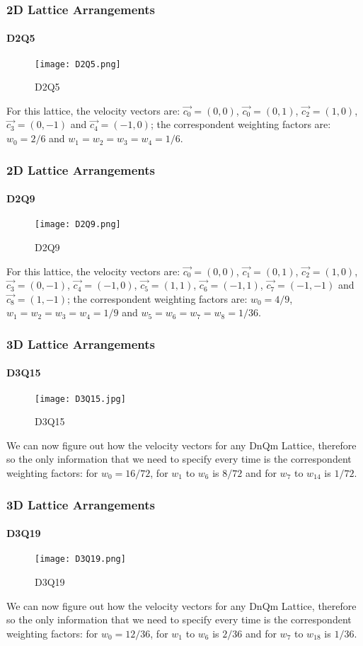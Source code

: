 \documentclass[12pt]{beamer}
\begin{document}
\begin{frame}
  \frametitle{2D Lattice Arrangements}
  \framesubtitle{D2Q5}
  \begin{figure}
    \centering
    \texttt{[image: D2Q5.png]}
    \caption{D2Q5}
  \end{figure}
  For this lattice, the velocity vectors are: $\vec{c_0}=(0,0)$, 
  $\vec{c_0}=(0,1)$, $\vec{c_2}=(1,0)$, 
  $\vec{c_3}=(0,-1)$ and $\vec{c_4}=(-1,0)$;
  the correspondent weighting factors are: $w_0=2/6$ and $w_1=w_2=w_3=w_4=1/6$.
\end{frame}

\begin{frame}
  \frametitle{2D Lattice Arrangements}
  \framesubtitle{D2Q9}
  \begin{figure}
    \centering
    \texttt{[image: D2Q9.png]}
    \caption{D2Q9}
  \end{figure}
    For this lattice, the velocity vectors are: $\vec{c_0}=(0,0)$, 
  $\vec{c_1}=(0,1)$, $\vec{c_2}=(1,0)$, 
  $\vec{c_3}=(0,-1)$, $\vec{c_4}=(-1,0)$, 
  $\vec{c_5}=(1,1)$, $\vec{c_6}=(-1,1)$, 
  $\vec{c_7}=(-1,-1)$ and $\vec{c_8}=(1,-1)$;
  the correspondent weighting factors are: $w_0=4/9$, $w_1=w_2=w_3=w_4=1/9$ 
  and $w_5=w_6=w_7=w_8=1/36$.
\end{frame}

\begin{frame}
  \frametitle{3D Lattice Arrangements}
  \framesubtitle{D3Q15}
  \begin{figure}
    \centering
    \texttt{[image: D3Q15.jpg]}
    \caption{D3Q15}
  \end{figure}
    We can now figure out how the velocity vectors for any DnQm Lattice, 
  therefore so the only information that we need to specify every time is 
  the correspondent weighting factors: for $w_0=16/72$, 
  for $w_1$ to $w_6$ is $8/72$ and for $w_7$ to $w_14$ is $1/72$.
\end{frame}

\begin{frame}
  \frametitle{3D Lattice Arrangements}
  \framesubtitle{D3Q19}
  \begin{figure}
    \centering
    \texttt{[image: D3Q19.png]}
    \caption{D3Q19}
  \end{figure}
    We can now figure out how the velocity vectors for any DnQm Lattice, 
  therefore so the only information that we need to specify every time is 
  the correspondent weighting factors: for $w_0=12/36$, 
  for $w_1$ to $w_6$ is $2/36$ and for $w_7$ to $w_18$ is $1/36$.
\end{frame}
\end{document}
